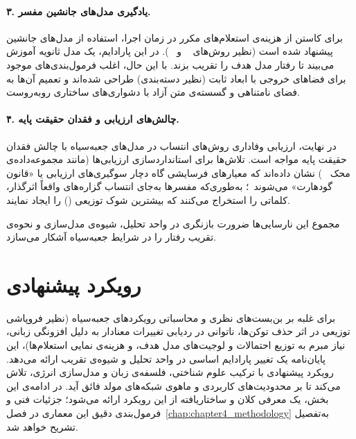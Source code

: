 \paragraph{۳. یادگیری مدل‌های جانشین مفسر.}
برای کاستن از هزینه‌ی استعلام‌های مکرر در زمان اجرا، استفاده از مدل‌های جانشین پیشنهاد شده است (نظیر روش‌های ~\cite{chen2018learning} و ~\cite{seyyedsalehi2024sointer}). در این پارادایم، یک مدل ثانویه آموزش می‌بیند تا رفتار مدل هدف را تقریب بزند. با این حال، اغلب فرمول‌بندی‌های موجود برای فضاهای خروجی با ابعاد ثابت (نظیر دسته‌بندی) طراحی شده‌اند و تعمیم آن‌ها به فضای نامتناهی و گسسته‌ی متن آزاد با دشواری‌های ساختاری روبه‌روست.

\paragraph{۴. چالش‌های ارزیابی و فقدان حقیقت پایه.}
در نهایت، ارزیابی وفاداری روش‌های انتساب در مدل‌های جعبه‌سیاه با چالش فقدان حقیقت پایه مواجه است. تلاش‌ها برای استانداردسازی ارزیابی‌ها (مانند مجموعه‌داده‌ی محک ~\cite{deyoung2020eraser}) نشان داده‌اند که معیارهای فرسایشی گاه دچار سوگیری‌های ارزیابی یا «قانون گودهارت» می‌شوند~\cite{ju2022logictraps, hsia2024goodhart}؛ به‌طوری‌که مفسرها به‌جای انتساب گزاره‌های واقعاً اثرگذار، کلماتی را استخراج می‌کنند که بیشترین شوک توزیعی () را ایجاد نمایند.

مجموع این نارسایی‌ها ضرورت بازنگری در واحد تحلیل، شیوه‌ی مدل‌سازی و نحوه‌ی تقریب رفتار را در شرایط جعبه‌سیاه آشکار می‌سازد.


\section{رویکرد پیشنهادی}\label{sec:1-4}

برای غلبه بر بن‌بست‌های نظری و محاسباتی رویکردهای جعبه‌سیاه (نظیر فروپاشی توزیعی در اثر حذف توکن‌ها، ناتوانی در ردیابی تغییرات معنادار به دلیل افزونگی زبانی، نیاز مبرم به توزیع احتمالات و لوجیت‌های مدل هدف، و هزینه‌ی نمایی استعلام‌ها)، این پایان‌نامه یک تغییر پارادایم اساسی در واحد تحلیل و شیوه‌ی تقریب ارائه می‌دهد. رویکرد پیشنهادی با ترکیب علوم شناختی، فلسفه‌ی زبان و مدل‌سازی انرژی، تلاش می‌کند تا بر محدودیت‌های کاربردی و ماهوی شبکه‌های مولد فائق آید. در ادامه‌ی این بخش، یک معرفی کلان و ساختاریافته از این رویکرد ارائه می‌شود؛ جزئیات فنی و فرمول‌بندی دقیق این معماری در فصل~\ref{chap:chapter4_methodology} به‌تفصیل تشریح خواهد شد.

